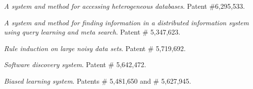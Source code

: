 \bi
\item {\em A system and method for accessing heterogeneous databases}.
Patent \#6,295,533.
\item {\em A system and method for finding information in a
distributed information system using query learning
and meta search}.  Patent \# 5,347,623.
\item {\em Rule induction on large noisy data sets}.  Patent \# 5,719,692.
\item {\em Software discovery system}.  Patent \#  5,642,472. 
\item {\em Biased learning system}.  Patents \# 5,481,650 and \# 5,627,945.
\ei



